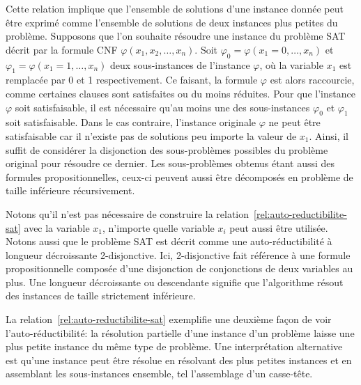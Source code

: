 Cette relation implique que l'ensemble de solutions d'une instance donnée peut être exprimé comme l'ensemble de solutions de deux instances plus petites du problème. Supposons que l'on souhaite résoudre une instance du problème SAT décrit par la formule CNF $\varphi(x_{1}, x_{2}, \dots, x_{n})$. Soit $\varphi_{0} = \varphi(x_{1}=0, \dots, x_{n})$ et $\varphi_{1} = \varphi(x_{1}=1, \dots, x_{n})$ deux sous-instances de l'instance $\varphi$, où la variable $x_{1}$ est remplacée par 0 et 1 respectivement. Ce faisant, la formule $\varphi$ est alors raccourcie, comme certaines clauses sont satisfaites ou du moins réduites. Pour que l'instance $\varphi$ soit satisfaisable, il est nécessaire qu'au moins une des sous-instances $\varphi_{0}$ et $\varphi_{1}$ soit satisfaisable. Dans le cas contraire, l'instance originale $\varphi$ ne peut être satisfaisable car il n'existe pas de solutions peu importe la valeur de $x_{1}$. Ainsi, il suffit de considérer la disjonction des sous-problèmes possibles du problème original pour résoudre ce dernier. Les sous-problèmes obtenus étant aussi des formules propositionnelles, ceux-ci peuvent aussi être décomposés en problème de taille inférieure récursivement. 

Notons qu'il n'est pas nécessaire de construire la relation~\ref{rel:auto-reductibilite-sat} avec la variable $x_{1}$, n'importe quelle variable $x_{i}$ peut aussi être utilisée. Notons aussi que le problème SAT est décrit comme une auto-réductibilité à longueur décroissante 2-disjonctive. Ici, 2-disjonctive fait référence à une formule propositionnelle composée d'une disjonction de conjonctions de deux variables au plus. Une longueur décroissante ou descendante signifie que l'algorithme résout des instances de taille strictement inférieure.

La relation~\ref{rel:auto-reductibilite-sat} exemplifie une deuxième façon de voir l'auto-réductibilité: la résolution partielle d'une instance d'un problème laisse une plus petite instance du même type de problème. Une interprétation alternative est qu'une instance peut être résolue en résolvant des plus petites instances et en assemblant les sous-instances ensemble, tel l'assemblage d'un casse-tête. 

